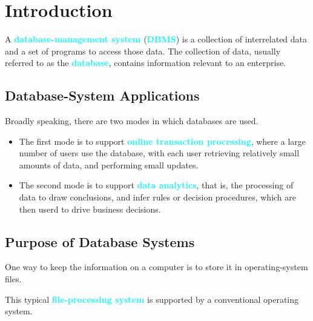 \documentclass[a4paper,12pt,twoside,openany]{book}
\newcommand{\textcy}[1]{\textbf{\textcolor{cyan}{#1}}}
\begin{document}

\restoregeometry
\thispagestyle{empty}
\setcounter{page}{0}
\tableofcontents
\thispagestyle{empty}
\setcounter{page}{0}


\chapter{Introduction}

A \textcy{database-management system} (\textcy{DBMS}) is a collection of interrelated data and a set of programs to access those data. The collection of data, usually referred to as the \textcy{database}, contains information relevant to an enterprise.

\section{Database-System Applications}

Broadly speaking, there are two modes in which databases are used.
\begin{itemize}
    \item The first mode is to support \textcy{online transaction processing}, where a large number of users use the database, with each user retrieving relatively small amounts of data, and performing small updates.
    \item The second mode is to support \textcy{data analytics}, that is, the processing of data to draw conclusions, and infer rules or decision procedures, which are then userd to drive business decisions.
\end{itemize}

\section{Purpose of Database Systems}

One way to keep the information on a computer is to store it in operating-system files.

This typical \textcy{file-processing system} is supported by a conventional operating system.
\end{document}
